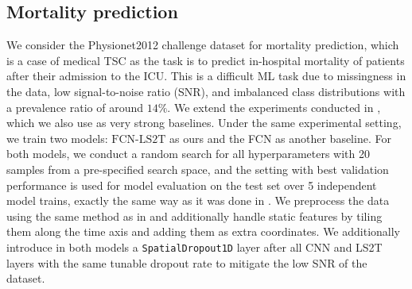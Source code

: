 \documentclass{article} \usepackage{iclr2021_conference,times}
\theoremstyle{plain}
\theoremstyle{definition}
\begin{document}
\subsection{Mortality prediction} \label{subseq:4_mortality}
We consider the  {\sc Physionet2012} challenge dataset \citep{goldberger2000components} for mortality prediction, which is a case of medical TSC as the task is to predict in-hospital mortality of patients after their admission to the ICU. This is a difficult ML task due to missingness in the data, low signal-to-noise ratio (SNR), and imbalanced class distributions with a prevalence ratio of around $14 \%$. We extend the experiments conducted in \citet{horn2020set}, which we also use as very strong baselines. Under the same experimental setting, we train two models: $\text{FCN-LS2T}$ as ours and the FCN as another baseline. For both models, we conduct a random search for all hyperparameters with 20 samples from a pre-specified search space, and the setting with best validation performance is used for model evaluation on the test set over 5 independent model trains, exactly the same way as it was done in \cite{horn2020set}. We preprocess the data using the same method as in \citet[eq.~(9)]{che2018recurrent} and additionally handle static features by tiling them along the time axis and adding them as extra coordinates. We additionally introduce in both models a \texttt{SpatialDropout1D} layer after all CNN and LS2T layers with the same tunable dropout rate to mitigate the low SNR of the dataset.
\end{document}
